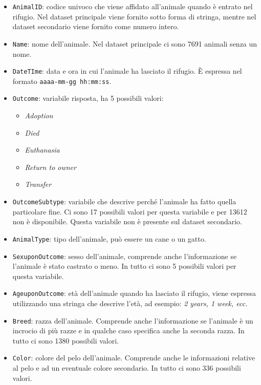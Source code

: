 \begin{itemize}
	\item \texttt{AnimalID}: codice univoco che viene affidato all'animale quando è entrato nel rifugio. Nel dataset principale viene fornito sotto forma di stringa, mentre nel dataset secondario viene fornito come numero intero.
	\item \texttt{Name}: nome dell'animale. Nel dataset principale ci sono 7691 animali senza un nome.
	\item \texttt{DateTIme}: data e ora in cui l'animale ha lasciato il rifugio. \`{E} espressa nel formato \texttt{aaaa-mm-gg hh:mm:ss}.
	\item \texttt{Outcome}: variabile risposta, ha 5 possibili valori:
		\begin{itemize}
			\item \textit{Adoption}
			\item \textit{Died}
			\item \textit{Euthanasia}
			\item \textit{Return to owner}
			\item \textit{Transfer}
		\end{itemize}
	\item \texttt{OutcomeSubtype}: variabile che descrive perché l'animale ha fatto quella particolare fine. Ci sono 17 possibili valori per questa variabile e per 13612 non è disponibile. Questa variabile non è presente sul dataset secondario.
	\item \texttt{AnimalType}: tipo dell'animale, può essere un cane o un gatto.
	\item \texttt{SexuponOutcome}: sesso dell'animale, comprende anche l'informazione se l'animale è stato castrato o meno. In tutto ci sono 5 possibili valori per questa variabile.
	\item \texttt{AgeuponOutcome}: età dell'animale quando ha lasciato il rifugio, viene espressa utilizzando una stringa che descrive l'età, ad esempio: \textit{2 years, 1 week, ecc.}
	\item \texttt{Breed}: razza dell'animale. Comprende anche l'informazione se l'animale è un incrocio di più razze e in qualche caso specifica anche la seconda razza. In tutto ci sono 1380 possibili valori.
	\item \texttt{Color}: colore del pelo dell'animale. Comprende anche le informazioni relative al pelo e ad un eventuale colore secondario. In tutto ci sono 336 possibili valori.
\end{itemize}

